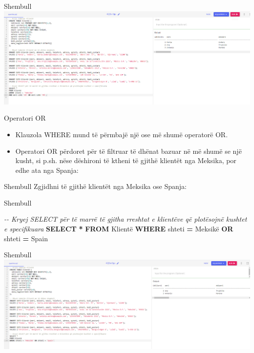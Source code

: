 \documentclass[
  ignorenonframetext,
]{beamer}
\newenvironment{Shaded}{\begin{snugshade}}{\end{snugshade}}
\newcommand{\CommentTok}[1]{\textcolor[rgb]{0.56,0.35,0.01}{\textit{#1}}}
\newcommand{\KeywordTok}[1]{\textcolor[rgb]{0.13,0.29,0.53}{\textbf{#1}}}
\newcommand{\NormalTok}[1]{#1}
\newcommand{\OperatorTok}[1]{\textcolor[rgb]{0.81,0.36,0.00}{\textbf{#1}}}
\newcommand{\StringTok}[1]{\textcolor[rgb]{0.31,0.60,0.02}{#1}}
\begin{document}
\begin{frame}{Shembull}
\label{shembull-31}
\includegraphics{./Figs/query17.png}
\end{frame}

\begin{frame}{Operatori OR}
\label{operatori-or}
\begin{itemize}
\item
  Klauzola WHERE mund të përmbajë një ose më shumë operatorë OR.
\item
  Operatori OR përdoret për të filtruar të dhënat bazuar në më shumë se
  një kusht, si p.sh. nëse dëshironi të ktheni të gjithë klientët nga
  Meksika, por edhe ata nga Spanja:
\end{itemize}
\end{frame}

\begin{frame}{Shembull}
\label{shembull-32}
Zgjidhni të gjithë klientët nga Meksika ose Spanja:
\end{frame}

\begin{frame}[fragile]{Shembull}
\label{shembull-33}

\begin{Shaded}
\begin{Highlighting}[]
\CommentTok{{-}{-} Kryej SELECT për të marrë të gjitha rreshtat e klientëve që plotësojnë kushtet e specifikuara}
\KeywordTok{SELECT} \OperatorTok{*} 
\KeywordTok{FROM}\NormalTok{ Klientë}
\KeywordTok{WHERE}\NormalTok{ shteti }\OperatorTok{=} \StringTok{\textquotesingle{}Meksikë\textquotesingle{}} \KeywordTok{OR}\NormalTok{ shteti }\OperatorTok{=} \StringTok{\textquotesingle{}Spain\textquotesingle{}}
\end{Highlighting}
\end{Shaded}
\end{frame}

\begin{frame}{Shembull}
\label{shembull-34}
\includegraphics{./Figs/query18.png}
\end{frame}
\end{document}

